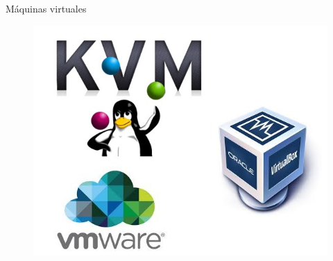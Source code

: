 \documentclass[11pt]{beamer}
\begin{document}
\begin{frame}{Máquinas virtuales}
  \begin{figure}
  	\includegraphics[scale=0.35]{images/vmachines}
  \end{figure}
\end{frame}
\end{document}
